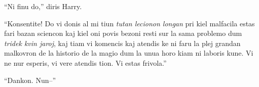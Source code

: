 ``Ni finu do,'' diris Harry.

``Konsentite! Do vi donis al mi tiun \emph{tutan lecionon longan} pri
kiel malfacila estas fari bazan sciencon kaj kiel oni povis bezoni
resti sur la sama problemo dum \emph{tridek kvin jaroj}, kaj tiam vi
komencis kaj atendis ke ni faru la plej grandan malkovron de la
historio de la magio dum la unua horo kiam ni laboris kune. Vi ne nur
esperis, vi vere atendis tion. Vi estas frivola.''

``Dankon. Nun--''














